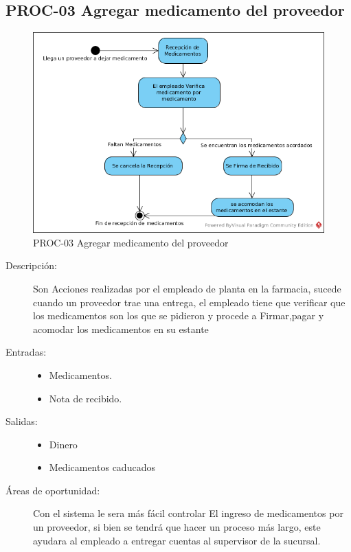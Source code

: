\subsection{PROC-03 Agregar medicamento del proveedor}

\begin{figure}[htbp]
	\begin{center}
		\includegraphics[width=.7\textwidth]{images/as-toprocAgreMedic}
		\caption{PROC-03 Agregar medicamento del proveedor}
		\label{fig:proceso1}
	\end{center}
\end{figure}

\begin{description}
	\item[Descripción:] Son Acciones realizadas por el empleado de planta en la farmacia, sucede cuando un proveedor trae una entrega, el empleado tiene que verificar que los medicamentos son los que se pidieron y procede a Firmar,pagar y acomodar los medicamentos en su  estante
	\item[Entradas:] \cdtEmpty
        \begin{itemize}
			\item Medicamentos.
			\item Nota de recibido.
        \end{itemize}
	\item[Salidas:] \cdtEmpty
        \begin{itemize}
			\item Dinero
			\item Medicamentos caducados
        \end{itemize}	
    \item[Áreas de oportunidad:] Con el sistema le sera más fácil controlar 
    El ingreso de medicamentos por un proveedor, si bien se tendrá que hacer un proceso más largo, este ayudara al empleado a entregar cuentas al supervisor de la sucursal.
     \end{description}
